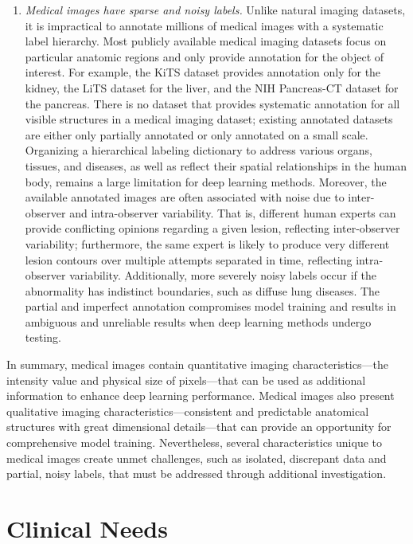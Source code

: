 \begin{enumerate}
    \item \textit{Medical images have sparse and noisy labels.} Unlike natural imaging datasets, it is impractical to annotate millions of medical images with a systematic label hierarchy. Most publicly available medical imaging datasets focus on particular anatomic regions and only provide annotation for the object of interest. For example, the KiTS dataset provides annotation only for the kidney, the LiTS dataset for the liver, and the NIH Pancreas-CT dataset for the pancreas. There is no dataset that provides systematic annotation for all visible structures in a medical imaging dataset; existing annotated datasets are either only partially annotated or only annotated on a small scale. Organizing a hierarchical labeling dictionary to address various organs, tissues, and diseases, as well as reflect their spatial relationships in the human body, remains a large limitation for deep learning methods. Moreover, the available annotated images are often associated with noise due to inter-observer and intra-observer variability. That is, different human experts can provide conflicting opinions regarding a given lesion, reflecting inter-observer variability; furthermore, the same expert is likely to produce very different lesion contours over multiple attempts separated in time, reflecting intra-observer variability. Additionally, more severely noisy labels occur if the abnormality has indistinct boundaries, such as diffuse lung diseases. The partial and imperfect annotation compromises model training and results in ambiguous and unreliable results when deep learning methods undergo testing. 

\end{enumerate}


In summary, medical images contain quantitative imaging characteristics---the intensity value and physical size of pixels---that can be used as additional information to enhance deep learning performance. Medical images also present qualitative imaging characteristics---consistent and predictable anatomical structures with great dimensional details---that can provide an opportunity for comprehensive model training. Nevertheless, several characteristics unique to medical images create unmet challenges, such as isolated, discrepant data and partial, noisy labels, that must be addressed through additional investigation.


\section{Clinical Needs}
\label{ch6:clinical_needs}

